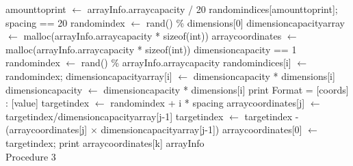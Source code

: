 \documentclass[10pt,twocolumn]{witseiepaper}
\begin{document}
\begin{appendix}
\begin{algorithm}[htbp]
\begin{algorithmic}
		\State amount\textunderscore to\textunderscore print $\leftarrow$ arrayInfo.array\textunderscore capacity / 20
		\State random\textunderscore indices[amount\textunderscore to\textunderscore print];
		\State spacing == 20
		\State random\textunderscore index $\leftarrow$ rand() \% dimensions[0]
		\State dimension\textunderscore capacity\textunderscore array $\leftarrow$ malloc(arrayInfo.array\textunderscore capacity * sizeof(int))
		\State array\textunderscore coordinates $\leftarrow$ malloc(arrayInfo.array\textunderscore capacity * sizeof(int))
		\State dimension\textunderscore capacity == 1
		\State random\textunderscore index $\leftarrow$ rand() \% arrayInfo.array\textunderscore capacity
		\State random\textunderscore indices[i] $\leftarrow$ random\textunderscore index;
		\EndWhile
		\EndFor
		\State dimension\textunderscore capacity\textunderscore array[i] $\leftarrow$ dimension\textunderscore capacity *  dimensions[i]
		\State dimension\textunderscore capacity $\leftarrow$ dimension\textunderscore capacity * dimensions[i]
		\EndFor
		\EndFunction
		\State print Format = [coords] : [value]
		\State target\textunderscore index $\leftarrow$ random\textunderscore index + i * spacing
		\State array\textunderscore coordinates[j] $\leftarrow$ target\textunderscore index/dimension\textunderscore capacity\textunderscore array[j-1]
		\State target\textunderscore index $\leftarrow$ target\textunderscore index - (array\textunderscore coordinates[j] $\times$ \textunderscore dimension\textunderscore capacity\textunderscore array[j-1])
		\EndIf
		\State array\textunderscore coordinates[0] $\leftarrow$ target\textunderscore index;
		\EndFor
		\State print array\textunderscore coordinates[k]
		\EndFor
		\EndFor
		\State \Return arrayInfo 
		\EndFunction \\
		\caption{Procedure 3}
		\label{alg:3}
	\end{algorithmic}
\end{algorithm}


\end{appendix}
\end{document}
